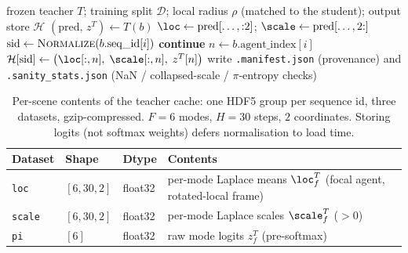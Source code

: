 \begin{algorithm}[htbp]
\caption{Offline teacher caching (run once over the training split)}
\label{alg:cache}
\begin{algorithmic}[1]
\Require frozen teacher $T$; training split $\mathcal{D}$; local radius $\rho$
  (matched to the student); output store $\mathcal{H}$
  \State $(\mathrm{pred},\, z^T) \gets T(b)$
  \State $\loc \gets \mathrm{pred}[\dots,{:}2]$;\quad
         $\scale \gets \mathrm{pred}[\dots,2{:}]$
    \State $\mathrm{sid} \gets \textsc{Normalize}(b.\mathrm{seq\_id}[i])$
     \textbf{continue} \label{algline:resume}
          \EndIf
    \State $n \gets b.\mathrm{agent\_index}[i]$ \label{algline:focal}
    \State $\mathcal{H}[\mathrm{sid}] \gets
            \big(\loc[:,n],\; \scale[:,n],\; z^T[n]\big)$
  \EndFor
\EndFor
\State write \texttt{.manifest.json} (provenance) and \texttt{.sanity\_stats.json}
       (NaN / collapsed-scale / $\pi$-entropy checks)
\end{algorithmic}
\end{algorithm}

\begin{table}[htbp]
  \centering
  \caption[Teacher-cache layout.]{Per-scene contents of the teacher cache: one HDF5
    group per sequence id, three datasets, gzip-compressed. $F{=}6$ modes,
    $H{=}30$ steps, $2$ coordinates. Storing logits (not softmax weights) defers
    normalisation to load time.}
  \label{tab:cache_schema}
  \begin{tabular}{lllp{5.4cm}}
    \toprule
    Dataset & Shape & Dtype & Contents \\
    \midrule
    \texttt{loc}   & $[6,30,2]$ & float32 & per-mode Laplace means $\loc^T_f$ (focal agent, rotated-local frame) \\
    \texttt{scale} & $[6,30,2]$ & float32 & per-mode Laplace scales $\scale^T_f$ ($>0$) \\
    \texttt{pi}    & $[6]$      & float32 & raw mode logits $z^T_f$ (pre-softmax) \\
    \bottomrule
  \end{tabular}
\end{table}

